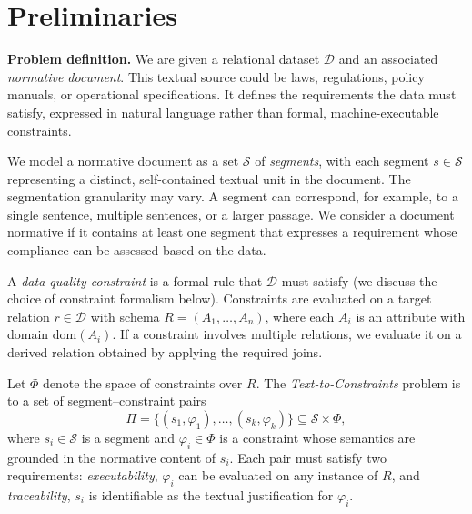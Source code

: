 \section{Preliminaries}
\label{sec:problem}

\smallskip\noindent\textbf{Problem definition.}
We are given a relational dataset $\mathcal{D}$ and an associated \emph{normative document}. This textual source could be laws, regulations, policy manuals, or operational specifications. It defines the requirements the data must satisfy, expressed in natural language rather than formal, machine-executable constraints.

We model a normative document as a set $\mathcal{S}$ of \emph{segments}, with each segment $s \in \mathcal{S}$ representing a distinct, self-contained textual unit in the document. The segmentation granularity may vary. A segment can correspond, for example, to a single sentence, multiple sentences, or a larger passage. We consider a document normative if it contains at least one segment that expresses a requirement whose compliance can be assessed based on the data.








A \emph{data quality constraint} is a formal rule that $\mathcal{D}$ must satisfy (we discuss the choice of constraint formalism below).
Constraints are evaluated on a target relation $r \in \mathcal{D}$ with schema $R = (A_1, \ldots, A_n)$, where each $A_i$ is an attribute with domain
$\mathrm{dom}(A_i)$. If a constraint involves multiple relations, we evaluate it on a derived relation obtained by applying the required joins.


Let $\Phi$ denote the space of constraints over $R$.
The \emph{Text-to-Constraints} problem is to  a set of segment--constraint pairs
\[
\Pi = \{(s_1, \varphi_1), \ldots, (s_k, \varphi_k)\} \subseteq \mathcal{S} \times \Phi,
\]
where $s_i \in \mathcal{S}$ is a segment and $\varphi_i \in \Phi$ is a constraint whose semantics are grounded in the normative content of $s_i$.
Each pair must satisfy two requirements: \emph{executability}, ${\varphi_i}$ can be evaluated on any instance of $R$, 
and \emph{traceability}, $s_i$ is identifiable as the textual justification for $\varphi_i$.

